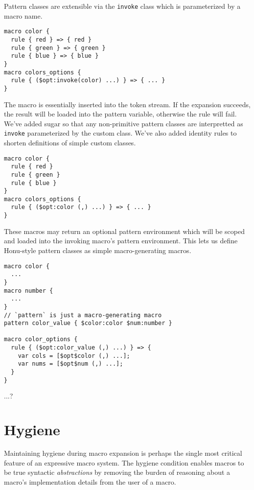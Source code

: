 \documentclass[preprint,10pt]{sigplanconf}
\begin{document}
Pattern classes are extensible via the \lstinline!invoke! class which
is parameterized by a macro name.

\begin{lstlisting}
macro color {
  rule { red } => { red }
  rule { green } => { green }
  rule { blue } => { blue }
}
macro colors_options {
  rule { ($opt:invoke(color) ...) } => { ... }
}
\end{lstlisting}

The macro is essentially inserted into the token stream. If the
expansion succeeds, the result will be loaded into the pattern
variable, otherwise the rule will fail. We've added sugar so that any
non-primitive pattern classes are interpretted as \lstinline!invoke!
parameterized by the custom class. We've also added identity rules to
shorten definitions of simple custom classes.

\begin{lstlisting}
macro color {
  rule { red }
  rule { green }
  rule { blue }
}
macro colors_options {
  rule { ($opt:color (,) ...) } => { ... }
}
\end{lstlisting}

These macros may return an optional pattern environment which will be
scoped and loaded into the invoking macro's pattern environment. This
lets us define Honu-style pattern classes as simple macro-generating
macros.

\begin{lstlisting}
macro color {
  ...
}
macro number {
  ...
}
// `pattern` is just a macro-generating macro
pattern color_value { $color:color $num:number }

macro color_options {
  rule { ($opt:color_value (,) ...) } => {
    var cols = [$opt$color (,) ...];
    var nums = [$opt$num (,) ...];
  }
}

\end{lstlisting}

...?



\section{Hygiene}
\label{sec:hygiene}

Maintaining hygiene during macro expansion is perhaps the single most
critical feature of an expressive macro system. The hygiene condition
enables macros to be true syntactic \emph{abstractions} by removing
the burden of reasoning about a macro's implementation details from the
user of a macro.
\end{document}

